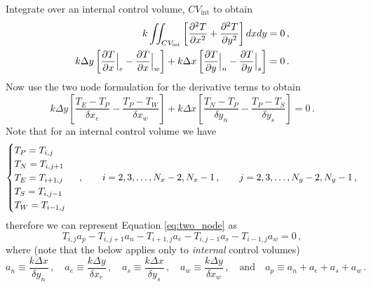 \documentclass{article}
\begin{document}
Integrate over an internal control volume, $CV_\text{int}$ to obtain
\begin{align*}
	k \iint_{CV_\text{int}} \left[ \pdv{^2T}{x^2} + \pdv{^2T}{y^2} \right] dxdy & = 0\,,\\
	k \Delta y \left[ \pdv{T}{x}\Big|_e - \pdv{T}{x}\Big|_w \right] + k \Delta x \left[ \pdv{T}{y}\Big|_{n} - \pdv{T}{y}\Big|_{s} \right] & = 0\,.
\end{align*}
Now use the two node formulation for the derivative terms to obtain
\begin{equation}
	\label{eq:two_node}
	k \Delta y \left[\frac{T_{E} - T_{P}}{\delta x_e} - \frac{T_{P} - T_{W}}{\delta x_w}\right] + k \Delta x \left[ \frac{T_{N} - T_{P}}{\delta y_n} -\frac{T_{P} - T_{S}}{\delta y_s} \right] = 0\,.
\end{equation}
Note that for an internal control volume we have
\[
	\begin{cases}
		T_P = T_{i,j} \\
		T_N = T_{i,j+1} \\
		T_E = T_{i+1,j} \\
		T_S = T_{i,j-1} \\
		T_W = T_{i-1,j}
	\end{cases}\,, \qquad i = 2, 3, \ldots, N_x - 2, N_x - 1\,, \qquad j = 2, 3, \ldots, N_y - 2, N_y - 1\,,\\
\]
therefore we can represent Equation \eqref{eq:two_node} as
\[
	T_{i,j} a_p - T_{i, j+1} a_n - T_{i+1, j} a_e - T_{i, j-1} a_s - T_{i-1, j} a_w = 0\,,
\]
where (note that the below applies only to \textit{internal} control volumes)
\[
	a_n \equiv \frac{k \Delta x}{\delta y_n}\,, \quad a_e \equiv \frac{k \Delta y}{\delta x_e}\,, \quad a_s \equiv \frac{k\Delta x}{\delta y_s}\,, \quad a_w \equiv \frac{k\Delta y}{\delta x_w}\,, \quad \text{and} \quad a_p \equiv a_n + a_e + a_s + a_w\,.
\]
\end{document}
